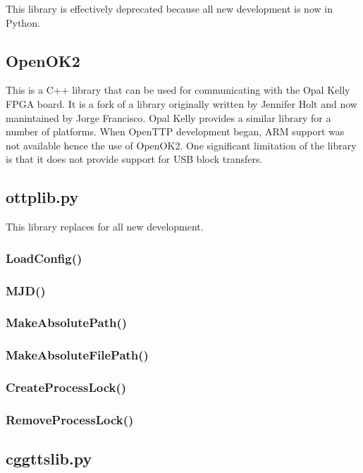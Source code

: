 This library is effectively deprecated because all new development is now in Python.

\subsection{OpenOK2}

This is a C++ library that can be used for communicating with the Opal Kelly FPGA board. It is 
a fork of a library originally written by Jennifer Holt and now manintained by Jorge Francisco.
Opal Kelly provides a similar library for a number of platforms. When OpenTTP development began,
ARM support was not available hence the use of OpenOK2. One significant limitation 
of the library is that it does not provide support for USB block transfers.

\subsection{ottplib.py}

This library replaces  for all new development.

\subsubsection{LoadConfig()}

\subsubsection{MJD()}

\subsubsection{MakeAbsolutePath()}

\subsubsection{MakeAbsoluteFilePath()}

\subsubsection{CreateProcessLock()}

\subsubsection{RemoveProcessLock()}

\subsection{cggttslib.py}


